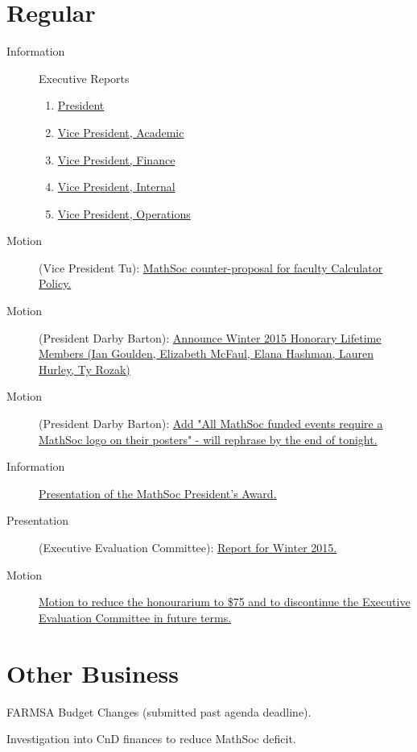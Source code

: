 \documentclass[12pt, letterpaper]{article}
\begin{document}
\section*{Regular}
\begin{description}
	\item[Information] Executive Reports
	\begin{enumerate}
		\item \hyperref[president]{President}
		\item \hyperref[vpacademic]{Vice President, Academic}
		\item \hyperref[vpfinance]{Vice President, Finance}
		\item \hyperref[vpinternal]{Vice President, Internal}
		\item \hyperref[vpoperations]{Vice President, Operations}
	\end{enumerate}
	\item[Motion] (Vice President Tu): \hyperref[calc]{MathSoc counter-proposal for faculty Calculator Policy.}
	\item[Motion] (President Darby Barton): \hyperref[hlm]{Announce Winter 2015 Honorary Lifetime Members (Ian Goulden, Elizabeth McFaul, Elana Hashman, Lauren Hurley, Ty Rozak)}
	\item[Motion] (President Darby Barton): \hyperref[clubs]{Add "All MathSoc funded events require a MathSoc logo on their posters" - will rephrase by the end of tonight.}
	\item[Information] \hyperref[award]{Presentation of the MathSoc President's Award.}
	\item[Presentation] (Executive Evaluation Committee): \hyperref[eec]{Report for Winter 2015.}
	\item[Motion] \hyperref[honour]{Motion to reduce the honourarium to \$75 and to discontinue the Executive Evaluation Committee in future terms.}
\end{description}
\HRule

\section*{Other Business}
\begin{description}
	\item FARMSA Budget Changes (submitted past agenda deadline).
	\item Investigation into CnD finances to reduce MathSoc deficit. 
\end{description}
\HRule

\newpage

\end{document}
